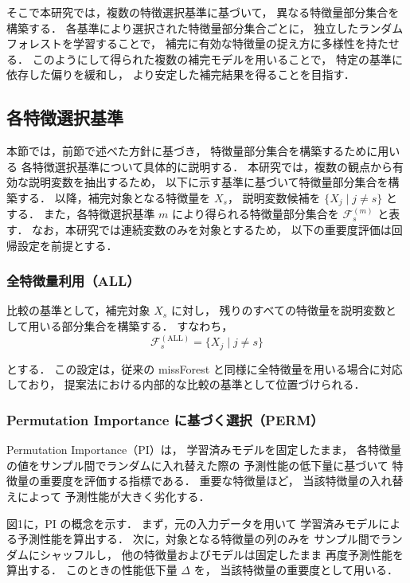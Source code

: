 そこで本研究では，複数の特徴選択基準に基づいて，
異なる特徴量部分集合を構築する．
各基準により選択された特徴量部分集合ごとに，
独立したランダムフォレストを学習することで，
補完に有効な特徴量の捉え方に多様性を持たせる．
このようにして得られた複数の補完モデルを用いることで，
特定の基準に依存した偏りを緩和し，
より安定した補完結果を得ることを目指す．

\subsection{各特徴選択基準}
本節では，前節で述べた方針に基づき，
特徴量部分集合を構築するために用いる
各特徴選択基準について具体的に説明する．
本研究では，複数の観点から有効な説明変数を抽出するため，
以下に示す基準に基づいて特徴量部分集合を構築する．
以降，補完対象となる特徴量を $X_s$，
説明変数候補を $\{X_j \mid j \neq s\}$ とする．
また，各特徴選択基準 $m$ により得られる特徴量部分集合を
$\mathcal{F}_s^{(m)}$ と表す．
なお，本研究では連続変数のみを対象とするため，
以下の重要度評価は回帰設定を前提とする．

\subsubsection{全特徴量利用（ALL）}
比較の基準として，補完対象 $X_s$ に対し，
残りのすべての特徴量を説明変数として用いる部分集合を構築する．
すなわち，
\begin{equation}
\mathcal{F}_s^{(\mathrm{ALL})} = \{ X_j \mid j \neq s \}
\end{equation}

とする．
この設定は，従来の missForest と同様に全特徴量を用いる場合に対応しており，
提案法における内部的な比較の基準として位置づけられる．

\subsubsection{Permutation Importance に基づく選択（PERM）}
Permutation Importance（PI）は，
学習済みモデルを固定したまま，
各特徴量の値をサンプル間でランダムに入れ替えた際の
予測性能の低下量に基づいて
特徴量の重要度を評価する指標である．
重要な特徴量ほど，
当該特徴量の入れ替えによって
予測性能が大きく劣化する．

図1に，PI の概念を示す．
まず，元の入力データを用いて
学習済みモデルによる予測性能を算出する．
次に，対象となる特徴量の列のみを
サンプル間でランダムにシャッフルし，
他の特徴量およびモデルは固定したまま
再度予測性能を算出する．
このときの性能低下量 $\Delta$ を，
当該特徴量の重要度として用いる．

